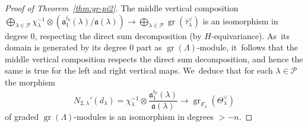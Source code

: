 \documentclass[JEP,XML,SOM,Unicode,NoFloatCountersInSection, NoEqCountersInSection,published]{cedram}
\let\ovl\overline
\renewcommand{\P}{\mathscr P}
\DeclareMathOperator{\gr}{gr}
\theoremstyle{plain}
\theoremstyle{definition}
\begin{document}
\begin{proof}[Proof of Theorem~\ref{thm:gr-pi2}]
The middle vertical composition $\bigoplus_{\lambda \in \P} \chi_\lambda^{-1} \otimes (\mathfrak{a}_1^{i_0}(\lambda)/\mathfrak{a}(\lambda)) \to \bigoplus_{\lambda \in \P} \gr(\ovl\tau_\lambda^\vee)$ is an isomorphism in degree 0, respecting the direct sum decomposition (by $H$-equivariance). As~its domain is generated by its degree 0 part as $\gr(\Lambda)$-module, it~follows that the middle vertical composition respects the direct sum decomposition, and hence the same is true for the left and right vertical maps. We~deduce that for each $\lambda \in \P$ the morphism
\begin{equation}\label{eq:N_2-lambda'}
N_{2,\lambda}'(d_\lambda) = \chi_\lambda^{-1} \otimes \frac{\mathfrak{a}_1^{i_0}(\lambda)}{\mathfrak{a}(\lambda)} \to \gr_{F_\lambda}(\Theta_\lambda^\vee)
\end{equation}
of graded $\gr(\Lambda)$-modules is an isomorphism in degrees $> -n$.


\end{proof}
\end{document}
